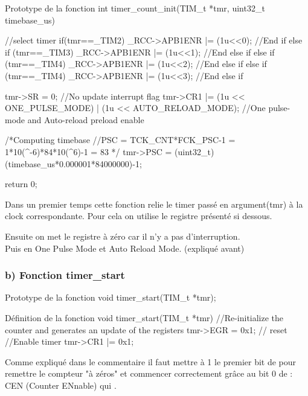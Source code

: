 \begin{Cpp}{Prototype de la fonction } 
int timer_count_init(TIM_t *tmr, uint32_t timebase_us)  {

		//select timer
		if(tmr==_TIM2) {
			_RCC->APB1ENR |= (1u<<0);	
		}//End if
		else if (tmr==_TIM3) {
			_RCC->APB1ENR |= (1u<<1);
		}//End else if
		else if (tmr==_TIM4) {
			_RCC->APB1ENR |= (1u<<2);
		}//End else if		
		else if (tmr==_TIM4) {
			_RCC->APB1ENR |= (1u<<3);
		}//End else if	
        
    	tmr->SR = 0; 														//No update interrupt flag
    	tmr->CR1 |=  (1u << ONE_PULSE_MODE) | (1u << AUTO_RELOAD_MODE);		//One pulse-mode and Auto-reload preload enable

		/*Computing timebase
		//PSC = TCK_CNT*FCK_PSC-1 = 1*10(^-6)*84*10(^6)-1 = 83
		*/
		tmr->PSC = (uint32_t) (timebase_us*0.000001*84000000)-1; 

		return 0;

}
\end{Cpp}

Dans un premier temps cette fonction relie le timer passé en argument(tmr) à la clock correspondante. Pour cela on utilise le registre  présenté si dessous.

Ensuite on met le registre  à zéro car il n'y a pas d'interruption.\\
Puis  en One Pulse Mode et Auto Reload Mode.
(expliqué avant)


\newpage
\subsubsection{b) Fonction timer\_start}
\begin{Cpp}{Prototype de la fonction} 
void timer_start(TIM_t *tmr);
\end{Cpp}

\begin{Cpp}{Définition de la fonction} 
void timer_start(TIM_t *tmr) {
		//Re-initialize the counter and generates an update of the registers
		tmr->EGR = 0x1;		// reset
		//Enable timer
		tmr->CR1 |= 0x1; 
}
\end{Cpp}

Comme expliqué dans le commentaire il faut mettre à 1 le premier bit de  pour remettre le compteur "à zéros" et commencer correctement grâce au bit 0 de  : CEN (Counter ENnable) qui .

